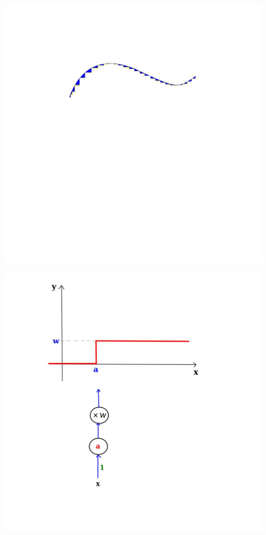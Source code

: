 \documentclass[12pt,aspectratio=169]{beamer}
\begin{document}
\begin{frame}
\begin{center}
\includegraphics[scale=0.4]{nonlinear4}
\end{center}
\end{frame}


\begin{frame}
\begin{center}
\includegraphics[scale=0.3]{step1}
\end{center}
\end{frame}
\end{document}
